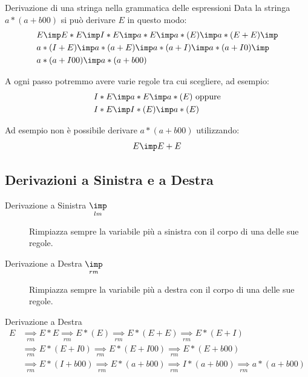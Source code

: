 \begin{example}{Derivazione di una stringa nella grammatica delle espressioni}{}
    Data la stringa $a*(a+b00)$ si può derivare $E$ in questo modo:
    \[
        \begin{aligned}
            &E \imp E*E\imp I*E\imp a*E\imp a*(E)\imp a*(E+E)\imp \\
            &a*(I+E)\imp a*(a+E)\imp a*(a+I)\imp a*(a+I0)\imp \\
            &a*(a+I00)\imp a*(a+b00)
        \end{aligned}
    \]
    \begin{note}
        A ogni passo potremmo avere varie regole tra cui scegliere, ad esempio:
        \[
            \begin{aligned}
                &I*E\imp a*E\imp a*(E) \text{ oppure} \\
                &I*E\imp I*(E)\imp a*(E)
            \end{aligned}
        \]
        \begin{critical}
            Ad esempio non è possibile derivare $a*(a+b00)$ utilizzando:
            \[
                E\imp E+E
            \]
        \end{critical}
    \end{note}
\end{example}
\subsection{Derivazioni a Sinistra e a Destra}\label{sub:ll_derivazioni_a_sinistra_e_a_destra} %
\begin{description}
    \item[Derivazione a Sinistra $\underset{lm}{\imp}$] Rimpiazza sempre la variabile più a sinistra con il corpo di una delle sue regole.
    \item[Derivazione a Destra $\underset{rm}{\imp}$] Rimpiazza sempre la variabile più a destra con il corpo di una delle sue regole.
\end{description}
\begin{example}{Derivazione a Destra}{}
    \[
        \begin{aligned}
            E &\underset{rm}{\implies}E*E \underset{rm}{\implies} E*(E) \underset{rm}{\implies} E*(E+E) \underset{rm}{\implies} E*(E+I) \\
            &\underset{rm}{\implies}E*(E+I0) \underset{rm}{\implies}E*(E+I00) \underset{rm}{\implies}E*(E+b00) \\
            &\underset{rm}{\implies} E*(I+b00) \underset{rm}{\implies}E*(a+b00) \underset{rm}{\implies}I * (a+b00) \underset{rm}{\implies} a * (a+b00)
        \end{aligned}
    \]
\end{example}
%

